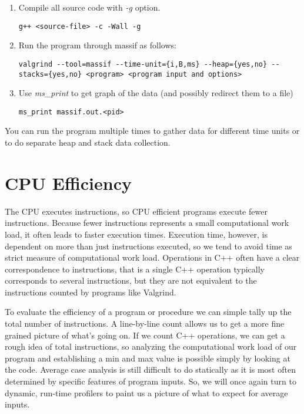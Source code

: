 \documentclass[]{tufte-handout}
\begin{document}
\begin{enumerate}
\item Compile all source code with \textit{-g} option.
\begin{verbatim}
g++ <source-file> -c -Wall -g
\end{verbatim}
\item Run the program through massif as follows:
\begin{verbatim}
valgrind --tool=massif --time-unit={i,B,ms} --heap={yes,no} --stacks={yes,no} <program> <program input and options>
\end{verbatim}
\item Use \textit{ms\_print} to get graph of the data (and possibly redirect them to a file)
\begin{verbatim}
ms_print massif.out.<pid> 
\end{verbatim}
\end{enumerate} 
You can run the program multiple times to gather data for different time units or to do separate heap and stack data collection.

\section{CPU Efficiency}

The CPU executes instructions, so CPU efficient programs execute fewer instructions. Because fewer instructions represents a small computational work load, it often leads to faster execution times. Execution time, however, is dependent on more than just instructions executed, so we tend to avoid time as strict measure of computational work load.  Operations in C++ often have a clear correspondence to instructions, that is a single C++ operation typically corresponds to several instructions, but they are not equivalent to the instructions counted by programs like Valgrind.

To evaluate the efficiency of a program or procedure we can simple tally up the total number of instructions.  A line-by-line count allows us to get a more fine grained picture of what's going on. If we count C++ operations, we can get a rough idea of total instructions, so analyzing the computational work load of our program and establishing a min and max value is possible simply by looking at the code.  Average case analysis is still difficult to do statically as it is most often determined by specific features of program inputs. So, we will once again turn to dynamic, run-time profilers to paint us a picture of what to expect for average inputs.  
\end{document}

